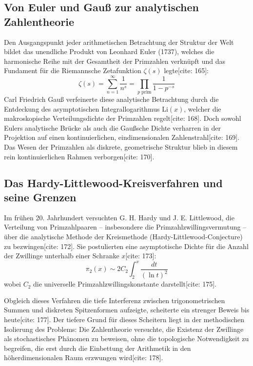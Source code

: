 \documentclass[11pt,a4paper]{article}
\theoremstyle{definition}
\begin{document}
	\subsection{Von Euler und Gauß zur analytischen Zahlentheorie}
	Den Ausgangspunkt jeder arithmetischen Betrachtung der Struktur der Welt bildet das unendliche Produkt von Leonhard Euler (1737), welches die harmonische Reihe mit der Gesamtheit der Primzahlen verknüpft und das Fundament für die Riemannsche Zetafunktion $\zeta(s)$ legte[cite: 165]:
	\begin{equation}
		\zeta(s) = \sum_{n=1}^{\infty} \frac{1}{n^s} = \prod_{p \text{ prim}} \frac{1}{1 - p^{-s}}
	\end{equation}
	Carl Friedrich Gauß verfeinerte diese analytische Betrachtung durch die Entdeckung des asymptotischen Integrallogarithmus $\text{Li}(x)$, welcher die makroskopische Verteilungsdichte der Primzahlen regelt[cite: 168]. Doch sowohl Eulers analytische Brücke als auch die Gaußsche Dichte verharren in der Projektion auf einen kontinuierlichen, eindimensionalen Zahlenstrahl[cite: 169]. Das Wesen der Primzahlen als diskrete, geometrische Struktur blieb in diesem rein kontinuierlichen Rahmen verborgen[cite: 170].
	
	\subsection{Das Hardy-Littlewood-Kreisverfahren und seine Grenzen}
	Im frühen 20. Jahrhundert versuchten G. H. Hardy und J. E. Littlewood, die Verteilung von Primzahlpaaren -- insbesondere die Primzahlzwillingsvermutung -- über die analytische Methode der Kreismethode (Hardy-Littlewood-Conjecture) zu bezwingen[cite: 172]. Sie postulierten eine asymptotische Dichte für die Anzahl der Zwillinge unterhalb einer Schranke $x$[cite: 173]:
	\begin{equation}
		\pi_2(x) \sim 2 C_2 \int_2^x \frac{dt}{(\ln t)^2}
	\end{equation}
	wobei $C_2$ die universelle Primzahlzwillingskonstante darstellt[cite: 175].
	
	Obgleich dieses Verfahren die tiefe Interferenz zwischen trigonometrischen Summen und diskreten Spitzenformen aufzeigte, scheiterte ein strenger Beweis bis heute[cite: 177]. Der tiefere Grund für dieses Scheitern liegt in der methodischen Isolierung des Problems: Die Zahlentheorie versuchte, die Existenz der Zwillinge als stochastisches Phänomen zu beweisen, ohne die topologische Notwendigkeit zu begreifen, die erst durch die Einbettung der Arithmetik in den höherdimensionalen Raum erzwungen wird[cite: 178].
	
\end{document}
